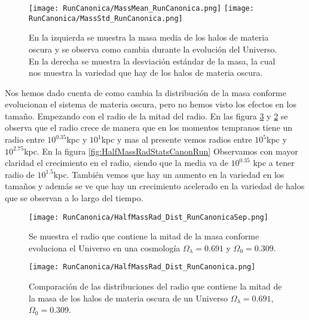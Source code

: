 \begin{figure}[ht!]
    \centering
    \texttt{[image: RunCanonica/MassMean\_RunCanonica.png]}
    \texttt{[image: RunCanonica/MassStd\_RunCanonica.png]}
    \caption[Media y desviación estándar de la distribución de masa de un Universo $\Omega_\lambda = 0.691 $, $\Omega_0 = 0.309$]{\footnotesize En la izquierda se muestra la masa media de los halos de materia oscura y se observa como cambia durante la evolución del Universo. En la derecha se muestra la desviación estándar de la masa, la cual nos muestra la variedad que hay de los halos de materia oscura.}
    \label{fig:MassStatsCanonRun}
\end{figure}

Nos hemos dado cuenta de como cambia la distribución de la masa conforme evolucionan el sistema de materia oscura, pero no hemos visto los efectos en los tamaño. Empezando con el radio de la mitad del radio. En las figura \ref{fig:HalfMassRadDistCanonRun} y \ref{fig:HalfMassRadDistCanonRunSep} se observa que el radio crece de manera que en los momentos tempranos tiene un radio entre $10^{0.35}$kpc y $10^{1}$kpc y mas al presente vemos radios entre $10^{5}$kpc y $10^{2.75}$kpc. En la figura \ref{fig:HalfMassRadStatsCanonRun} Observamos con mayor claridad el crecimiento en el radio, siendo que la media va de $10^{0.35}$ kpc a tener radio de $10^{1.5}$kpc. También vemos que hay un aumento en la variedad en los tamaños y además se ve que hay un crecimiento acelerado en la variedad de halos que se observan a lo largo del tiempo.

\begin{figure}[ht!]
    \centering
    \texttt{[image: RunCanonica/HalfMassRad\_Dist\_RunCanonicaSep.png]}
    \caption[Radio que contiene la mitad de la masa en la evolución de un Universo $\Omega_\lambda = 0.691 $, $\Omega_0 = 0.309$]{\footnotesize Se muestra el radio que contiene la mitad de la masa conforme evoluciona el Universo en una cosmología $\Omega_\lambda = 0.691 $ y $\Omega_0 = 0.309$.}
    \label{fig:HalfMassRadDistCanonRunSep}
\end{figure}

\begin{figure}[ht!]
    \centering
    \texttt{[image: RunCanonica/HalfMassRad\_Dist\_RunCanonica.png]}
    \caption[Distribución del Radio que contiene la mitad de la masa de un Universo $\Omega_\lambda = 0.691 $, $\Omega_0 = 0.309$]{\footnotesize Comparación de las distribuciones del radio que contiene la mitad de la masa de los halos de materia oscura de un Universo $\Omega_\lambda = 0.691 $, $\Omega_0 = 0.309$.}
    \label{fig:HalfMassRadDistCanonRun}
\end{figure}

